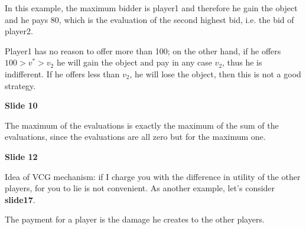 \noindent In this example, the maximum bidder is player1 and therefore he gain 
the object and he pays 80, which is the evaluation of the second highest bid, 
i.e. the bid of player2.

\noindent Player1 has no reason to offer more than 100; on the other hand, if he 
offers $100 > v^* > v_2$ he will gain the object and pay in any case $v_2$, thus 
he is indifferent. If he offers less than $v_2$, he will lose the object, then 
this is not a good strategy.

\bigskip
\noindent \textbf{Slide 10}

\noindent The maximum of the evaluations is exactly the maximum of the sum of 
the evaluations, since the evaluations are all zero but for the maximum one.

\bigskip
\noindent \textbf{Slide 12}

\noindent Idea of VCG mechanism: if I charge you with the difference in utility 
of the other players, for you to lie is not convenient. As another example, 
let's consider \textbf{slide17}.

\noindent The payment for a player is the damage he creates to the other 
players.

%
